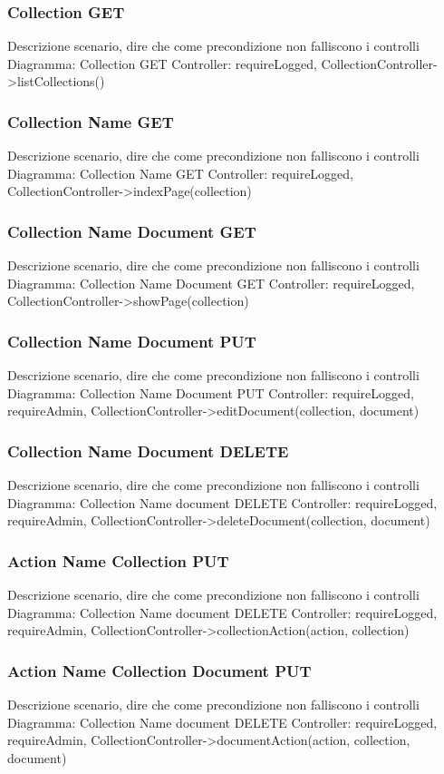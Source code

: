 \subsubsection{Collection GET}
Descrizione scenario, dire che come precondizione non falliscono i controlli
Diagramma: Collection GET
Controller: requireLogged, CollectionController->listCollections()

\subsubsection{Collection Name GET}
Descrizione scenario, dire che come precondizione non falliscono i controlli
Diagramma: Collection Name GET
Controller: requireLogged, CollectionController->indexPage(collection)

\subsubsection{Collection Name Document GET}
Descrizione scenario, dire che come precondizione non falliscono i controlli
Diagramma: Collection Name Document GET
Controller: requireLogged, CollectionController->showPage(collection)

\subsubsection{Collection Name Document PUT}
Descrizione scenario, dire che come precondizione non falliscono i controlli
Diagramma: Collection Name Document PUT
Controller: requireLogged, requireAdmin, CollectionController->editDocument(collection, document)

\subsubsection{Collection Name Document DELETE}
Descrizione scenario, dire che come precondizione non falliscono i controlli
Diagramma: Collection Name document DELETE
Controller: requireLogged, requireAdmin, CollectionController->deleteDocument(collection, document)

\subsubsection{Action Name Collection PUT}
Descrizione scenario, dire che come precondizione non falliscono i controlli
Diagramma: Collection Name document DELETE
Controller: requireLogged, requireAdmin, CollectionController->collectionAction(action, collection)

\subsubsection{Action Name Collection Document PUT}
Descrizione scenario, dire che come precondizione non falliscono i controlli
Diagramma: Collection Name document DELETE
Controller: requireLogged, requireAdmin, CollectionController->documentAction(action, collection, document)
